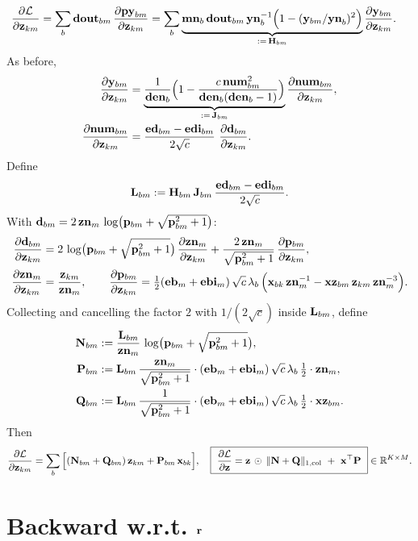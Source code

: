 \documentclass{article}
\begin{document}
\begin{align}
\ddfrac{\mathcal{L}}{\v{z}{km}}
&= \sum_b \v{dout}{bm}\,\ddfrac{\v{py}{bm}}{\v{z}{km}}
= \sum_b \underbrace{\v{mn}_b\,\v{dout}{bm}\,\v{yn}_b^{-1}\Big(1-(\v{y}{bm}/\v{yn}_b)^2\Big)}_{:=\,\v{H}{bm}}\ddfrac{\v{y}{bm}}{\v{z}{km}}.
\end{align}
As before,
\begin{align}
\ddfrac{\v{y}{bm}}{\v{z}{km}}
&= \underbrace{\frac{1}{\v{den}{b}}\Big(1-\frac{c\,\v{num}{bm}^2}{\v{den}{b}(\v{den}{b}-1)}\Big)}_{:=\,\v{J}{bm}}
\ddfrac{\v{num}{bm}}{\v{z}{km}},\\
\ddfrac{\v{num}{bm}}{\v{z}{km}}
&= \frac{\v{ed}{bm}-\v{edi}{bm}}{2\sqrt{c}}\ \ddfrac{\v{d}{bm}}{\v{z}{km}}.
\end{align}
Define
\[
\v{L}{bm}:=\v{H}{bm}\,\v{J}{bm}\,\frac{\v{ed}{bm}-\v{edi}{bm}}{2\sqrt{c}}.
\]
With $\v{d}{bm}=2\,\v{zn}{m}\,\log\!\big(\v{p}{bm}+\sqrt{\v{p}{bm}^2+1}\big)$:
\begin{align}
\ddfrac{\v{d}{bm}}{\v{z}{km}}
&= 2\,\log\!\big(\v{p}{bm}+\sqrt{\v{p}{bm}^2+1}\big)\,\ddfrac{\v{zn}{m}}{\v{z}{km}}
+ \frac{2\,\v{zn}{m}}{\sqrt{\v{p}{bm}^2+1}}\,\ddfrac{\v{p}{bm}}{\v{z}{km}},
\\
\ddfrac{\v{zn}{m}}{\v{z}{km}} &= \frac{\v{z}{km}}{\v{zn}{m}},\qquad
\ddfrac{\v{p}{bm}}{\v{z}{km}}
= \tfrac12(\v{eb}{m}+\v{ebi}{m})\,\sqrt{c}\,\lambda_b\,
\Big(\v{x}{bk}\,\v{zn}{m}^{-1} - \v{xz}{bm}\,\v{z}{km}\,\v{zn}{m}^{-3}\Big).
\end{align}
Collecting and cancelling the factor $2$ with $1/(2\sqrt{c})$ inside $\v{L}{bm}$, define
\begin{align}
\v{N}{bm} &:= \frac{\v{L}{bm}}{\v{zn}{m}}\,\log\!\big(\v{p}{bm}+\sqrt{\v{p}{bm}^2+1}\big),\\
\v{P}{bm} &:= \v{L}{bm}\,\frac{\v{zn}{m}}{\sqrt{\v{p}{bm}^2+1}}
\cdot (\v{eb}{m}+\v{ebi}{m})\,\sqrt{c}\,\lambda_b\,\tfrac{1}{2}\cdot \v{zn}{m},\\
\v{Q}{bm} &:= \v{L}{bm}\,\frac{1}{\sqrt{\v{p}{bm}^2+1}}
\cdot (\v{eb}{m}+\v{ebi}{m})\,\sqrt{c}\,\lambda_b\,\tfrac{1}{2}\cdot \v{xz}{bm}.
\end{align}
Then
\[
\ddfrac{\mathcal{L}}{\v{z}{km}}
= \sum_b \Big[(\v{N}{bm}+\v{Q}{bm})\,\v{z}{km} + \v{P}{bm}\,\v{x}{bk}\Big],
\quad
\boxed{\ \ddfrac{\mathcal{L}}{\v{z}} = \v{z}\,\had\,\colnorm{\v{N}+\v{Q}}\ +\ \v{x}^\top \v{P}\ }\in\mathbb{R}^{K\times M}.
\]

\section{Backward w.r.t. $\v{r}$}
\end{document}
